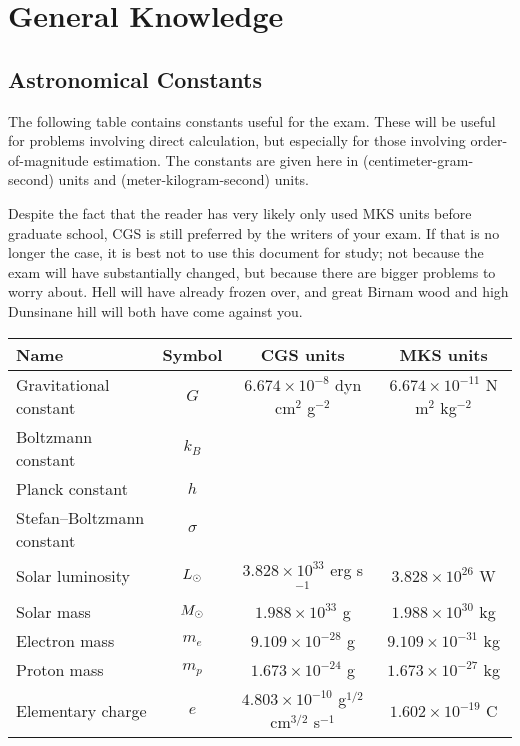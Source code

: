\chapter{General Knowledge}


\section{Astronomical Constants}
The following table contains constants useful for the exam. These will be useful for problems involving direct calculation, but especially for those involving order-of-magnitude estimation. The constants are given here in  (centimeter-gram-second) units and  (meter-kilogram-second) units.

Despite the fact that the reader has very likely only used MKS units before graduate school, CGS is still preferred by the writers of your exam. If that is no longer the case, it is best not to use this document for study; not because the exam will have substantially changed, but because there are bigger problems to worry about. Hell will have already frozen over, and great Birnam wood and high Dunsinane hill will both have come against you.

\begin{center}
    \begin{tabular}{|lccc|}
        \hline
        \textbf{Name} & \textbf{Symbol} & \textbf{CGS units} & \textbf{MKS units} \\
        \hline
        Gravitational constant & $G$ & $6.674 \times 10^{-8}$ dyn cm$^2$ g$^{-2}$ & $6.674 \times 10^{-11}$ N m$^2$ kg$^{-2}$ \\
        Boltzmann constant & $k_B$ & & \\
        Planck constant & $h$ & & \\
        Stefan--Boltzmann constant & $\sigma$ & & \\
        Solar luminosity & ${L_\odot}$ & $3.828 \times 10^{33}$ erg s$^{-1}$ & $3.828 \times 10^{26}$ W \\
        Solar mass & ${M_\odot}$ & $1.988 \times 10^{33}$ g & $1.988 \times 10^{30}$ kg \\
        Electron mass & $m_e$ & $9.109 \times 10^{-28}$ g & $9.109 \times 10^{-31}$ kg \\
        Proton mass & $m_p$ & $1.673 \times 10^{-24}$ g & $1.673 \times 10^{-27}$ kg \\
        Elementary charge & $e$ & $4.803 \times 10^{-10}$ g$^{1/2}$ cm$^{3/2}$ s$^{-1}$ & $1.602 \times 10^{-19}$ C \\
        \hline
    \end{tabular}
\end{center}

